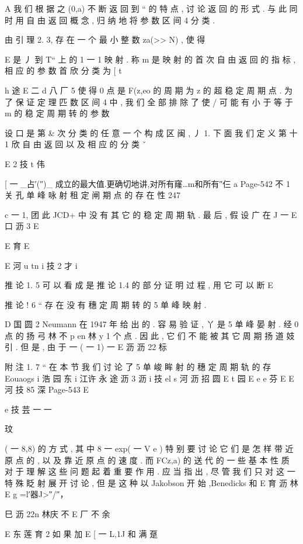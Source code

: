 {{A 我 们 根 据 之 (0,a) 不 断 返 回 到 “ 的 特 点 , 讨 论 返 回 的 形 式 .
与 此 同 时 用 自 由 返 回 概 念 , 归 纳 地 将 参 数 区 间 4 分 类 .

由 引 理 2. 3, 存 在 一 个 最 小 整 数 za(>> N) , 使 得

E
是 丿 到 T“ 上 的 1 一 1 映 射 . 称 m 是 映 射 的 首 次 自 由 返 回 的 指 标 ,
相 应 的 参 数 首 欣 分 类 为
[ t

h 途
E 二 d 八 厂 5
使 得 0 点 是 F(z,eo 的 周 期 为 z 的 超 稳 定 周 期 点 . 为 了 保 证 定 理
匹
数 区 间 4 中 , 我 们 全 部 排 除 了 使 / 可 能 有 小 于 等 于 m 的 稳 定 周
期 转 的 参 数

设 口 是 第 & 次 分 类 的 任 意 一 个 构 成 区 闽 , 丿 1. 下 面 我 们 定 义
第 十 1 欣 自 由 返 回 以 及 相 应 的 分 类 ˇ

E 2 技
t 伟

[ 一 _占′(″)_
成立的最大值.更确切地讲,对所有窿…m和所有″仨 a
Page-542
不 1 关 孔 单 峰 咏 射 租 定 闸 期 点 的 存 在 性 247

c
一 1, 团 此 JCD+ 中 没 有 其 它 的 稳 定 周 期 轨 . 最 后 , 假 设 广 在 J 一
E 口 沥 3
E

E 育
E

E 河 u tn i 技 2 才
i

推 论 1. 5 可 以 看 成 是 推 论 1.4 的 部 分 证 明 过 程 , 用 它 可 以 断
E

推 论 ! 6 “ 存 在 没 有 穗 定 周 期 转 的 5 单 峰 映 射 .

D 国 圆 2
Neumann 在 1947 年 给 出 的 . 容 易 验 证 , 丫 是 5 单 峰 晏 射 . 经 0 点 的
扬
弓 林 不 p en 林 y 1
个 点 . 因 此 , 它 们 不 能 被 其 它 周 期 扬 道 妓 引 . 但 是 , 由 于 一 ( 一 1) 一
E 沥 沥 22 标

附 注 1. 7 “ 在 本 节 我 们 讨 论 了 5 单 峻 眸 射 的 穗 定 周 期 轨 的 存
Eouaogs i 浩 园 东 i 江许 永 途 沥 3
沥 i 技
el s 河 沥 招 圆
E t 园
E
e
e 芬
E
E 河 技 85 深
Page-543
E

e 技 芸 一 一

玟

( 一 8,8) 的 方 式 , 其 中 8 一 exp( 一 V e ) 特 别 要 讨 论 它 们 是 怎 样
带 近 原 点 的 , 以 及 靠 近 原 点 的 速 度 . 而 FCz,a) 的 送 代 的 一 些 基 本
性 质 对 于 理 解 这 些 问 题 起 着 重 要 作 用 . 应 当 指 出 , 尽 管 我 们 只 对 这
一 特 殊 眨 射 展 开 讨 论 , 但 是 这 种 以 Jakobson 开 始 ,Benedicks 和
E 育 沥 林 E
g =l′器J>″/″，

巳 沥 22n 林庆 不
E 厂 不 余

E 东 莲 育 2
如 果 加 E [ 一 L,1J 和 满 趸

}}
